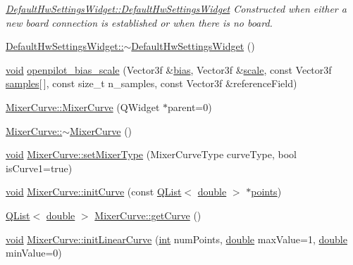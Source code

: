 \begin{DoxyCompactItemize}
\begin{DoxyCompactList}\small\item\em \hyperlink{group___config_plugin_ga70b182d3a503dd16f8ac5c389306bc50}{Default\-Hw\-Settings\-Widget\-::\-Default\-Hw\-Settings\-Widget} Constructed when either a new board connection is established or when there is no board. \end{DoxyCompactList}\item 
\hyperlink{group___config_plugin_ga0789663f8a021f1e85e03a41f99639c9}{Default\-Hw\-Settings\-Widget\-::$\sim$\-Default\-Hw\-Settings\-Widget} ()
\item 
\hyperlink{group___u_a_v_objects_plugin_ga444cf2ff3f0ecbe028adce838d373f5c}{void} \hyperlink{group___config_plugin_ga0b4a9c7b3d9017c7ddef423745b54f68}{openpilot\-\_\-bias\-\_\-scale} (Vector3f \&\hyperlink{glext_8h_a39c3ffa18f420251c5d132dd8c1c6137}{bias}, Vector3f \&\hyperlink{glext_8h_a281421b881aa7a1266842b73a3bc7655}{scale}, const Vector3f \hyperlink{glext_8h_aba70cd077c2c52c15358c231c6d293aa}{samples}\mbox{[}$\,$\mbox{]}, const size\-\_\-t n\-\_\-samples, const Vector3f \&reference\-Field)
\item 
\hyperlink{group___config_plugin_ga1124f8bbbfadf0a60fe37c681a323689}{Mixer\-Curve\-::\-Mixer\-Curve} (Q\-Widget $\ast$parent=0)
\item 
\hyperlink{group___config_plugin_ga1ecc6d88c82c0c4403185f1741bd096c}{Mixer\-Curve\-::$\sim$\-Mixer\-Curve} ()
\item 
\hyperlink{group___u_a_v_objects_plugin_ga444cf2ff3f0ecbe028adce838d373f5c}{void} \hyperlink{group___config_plugin_ga9fbf13c7b139059e1c3b8788a937b817}{Mixer\-Curve\-::set\-Mixer\-Type} (Mixer\-Curve\-Type curve\-Type, bool is\-Curve1=true)
\item 
\hyperlink{group___u_a_v_objects_plugin_ga444cf2ff3f0ecbe028adce838d373f5c}{void} \hyperlink{group___config_plugin_ga2c2f4469e3a93a1aa88633e97073ffa1}{Mixer\-Curve\-::init\-Curve} (const \hyperlink{class_q_list}{Q\-List}$<$ \hyperlink{_super_l_u_support_8h_a8956b2b9f49bf918deed98379d159ca7}{double} $>$ $\ast$\hyperlink{glext_8h_ae75d9f560170dfeaadc8718c87f5fbec}{points})
\item 
\hyperlink{class_q_list}{Q\-List}$<$ \hyperlink{_super_l_u_support_8h_a8956b2b9f49bf918deed98379d159ca7}{double} $>$ \hyperlink{group___config_plugin_ga676b2baa08ec2deceb84e56ceddd9c6c}{Mixer\-Curve\-::get\-Curve} ()
\item 
\hyperlink{group___u_a_v_objects_plugin_ga444cf2ff3f0ecbe028adce838d373f5c}{void} \hyperlink{group___config_plugin_ga149a9a0d28a983db45a48ed71c35f21d}{Mixer\-Curve\-::init\-Linear\-Curve} (\hyperlink{ioapi_8h_a787fa3cf048117ba7123753c1e74fcd6}{int} num\-Points, \hyperlink{_super_l_u_support_8h_a8956b2b9f49bf918deed98379d159ca7}{double} max\-Value=1, \hyperlink{_super_l_u_support_8h_a8956b2b9f49bf918deed98379d159ca7}{double} min\-Value=0)

\end{DoxyCompactItemize}
